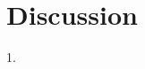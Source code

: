 \documentclass[10pt]{article}
\begin{document}












\section*{Discussion}

1. 
\end{document}
